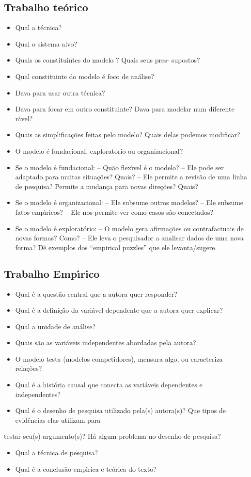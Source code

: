 \documentclass[11pt]{article}
\begin{document}
\subsection{Trabalho teórico}
\label{sec:org673df3b}

\begin{itemize}
\item Qual a técnica?
\item Qual o sistema alvo?
\item Quais os constituintes do modelo ? Quais seus pres- supostos?
\item Qual constituinte do modelo é foco de análise?
\item Dava para usar outra técnica?
\item Dava para focar em outro constituinte? Dava para modelar num diferente nı́vel?
\item Quais as simplificações feitas pelo modelo? Quais delas podemos modificar?
\item O modelo é fundacional, exploratorio ou organizacional?
\item Se o modelo é fundacional:
– Quão flexı́vel é o modelo?
– Ele pode ser adaptado para muitas situações? Quais?
– Ele permite a revisão de uma linha de pesquisa? Permite a mudança para novas direções? Quais?
\item Se o modelo é organizacional:
– Ele subsume outros modelos?
– Ele subsume fatos empı́ricos?
– Ele nos permite ver como casos são conectados?
\item Se o modelo é exploratório:
– O modelo gera afirmações ou contrafactuais de novas formas? Como?
– Ele leva o pesquisador a analisar dados de uma nova forma? Dê exemplos dos
“empirical puzzles” que ele levanta/sugere.
\end{itemize}
\subsection{Trabalho Empı́rico}
\label{sec:orgbcb813b}

\begin{itemize}
\item Qual é a questão central que a autora quer responder?
\item Qual é a definição da variável dependente que a autora quer explicar?
\item Qual a unidade de análise?
\item Quais são as variáveis independentes abordadas pela autora?
\item O modelo testa (modelos competidores), mensura algo, ou caracteriza relações?
\item Qual é a história causal que conecta as variáveis dependentes e independentes?
\item Qual é o desenho de pesquisa utilizado pela(s) autora(s)? Que tipos de
evidências elas utilizam para
\end{itemize}
testar seu(s) argumento(s)? Há algum problema no desenho de pesquisa?
\begin{itemize}
\item Qual a técnica de pesquisa?
\item Qual é a conclusão empı́rica e teórica do texto?
\end{itemize}
\end{document}
